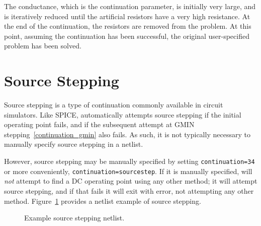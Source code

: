 The conductance, which is the continuation parameter, is initially
very large, and is iteratively reduced until the artificial resistors
have a very high resistance. At the end of the continuation, the
resistors are removed from the problem. At this point, assuming the
continuation has been successful, the original user-specified problem
has been solved.

\newpage 
\section{Source Stepping}
\label{continuation_source}

Source stepping is a type of continuation commonly available in circuit simulators.
Like SPICE, \Xyce{} automatically attempts source stepping if the initial
operating point fails, and if the subsequent attempt at GMIN stepping~\ref{continuation_gmin} 
also fails.  As such, it is not typically necessary to manually 
specify source stepping in a \Xyce{} netlist.

However, source stepping may be manually specified by setting
\texttt{continuation=34} or more conveniently, \texttt{continuation=sourcestep}. If it 
is manually specified,\Xyce{} will \emph{not} attempt to find a DC operating 
point using any other method; it will attempt source stepping, and if that fails 
it will exit with error, not attempting any other method. 
Figure~\ref{sourceStep_netlist} provides a netlist example of source stepping.

\begin{figure}[htbp]
\begin{centering}
\caption [Example source stepping netlist.]{Example source stepping netlist. 
\label  {sourceStep_netlist}}
\end{centering}
\end{figure}

